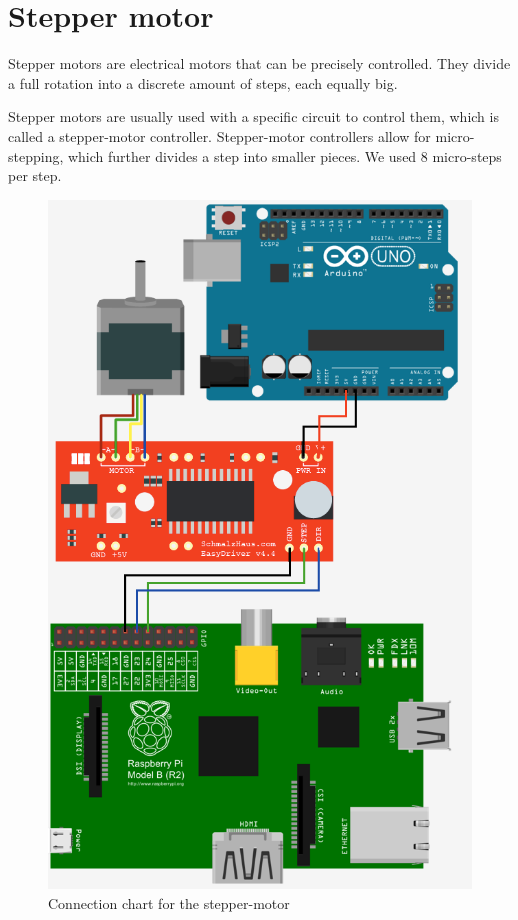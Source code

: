\clearpage
\section{Stepper motor}
Stepper motors are electrical motors that can be precisely controlled. They divide a full rotation into a discrete amount of steps, each equally big.

Stepper motors are usually used with a specific circuit to control them, which is called a stepper-motor controller. Stepper-motor controllers allow for micro-stepping, which further divides a step into smaller pieces. We used 8 micro-steps per step.

\begin{figure}[H]
	\centering
	\includegraphics[scale=.5]{images/steppermotor.png}
	\caption{Connection chart for the stepper-motor}
	\label{fig:steppermotor}
\end{figure}

